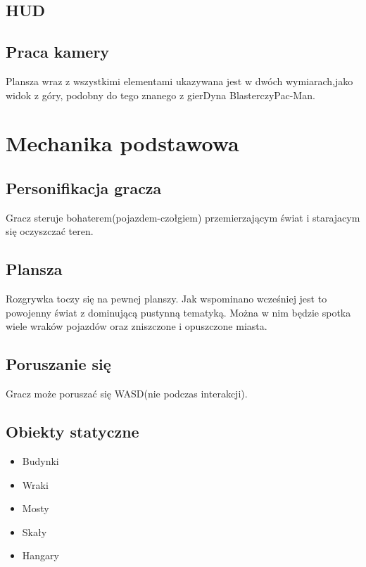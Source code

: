 \documentclass{article}
\begin{document}
    \subsection{HUD}
    \subsection{Praca kamery}
    Plansza  wraz  z  wszystkimi  elementami  ukazywana  jest  w  dwóch  wymiarach,jako  widok  z  góry,  podobny  do  tego  znanego  z  gierDyna  BlasterczyPac-Man.
    \newpage
    
\section{Mechanika podstawowa}
    \subsection{Personifikacja gracza}
    Gracz steruje bohaterem(pojazdem-czołgiem) przemierzającym świat i starajacym się oczyszczać teren.
    \subsection{Plansza}
    Rozgrywka toczy się na pewnej planszy. Jak wspominano wcześniej jest to powojenny świat z dominującą pustynną tematyką. Można w nim będzie spotka wiele wraków pojazdów oraz zniszczone i opuszczone miasta.
    \subsection{Poruszanie się}
    Gracz może poruszać się WASD(nie podczas interakcji).
    \subsection{Obiekty statyczne}
    \begin{itemize}
        \item Budynki
        \item Wraki
        \item Mosty
        \item Skały
        \item Hangary
        
    \end{itemize}
\end{document}
